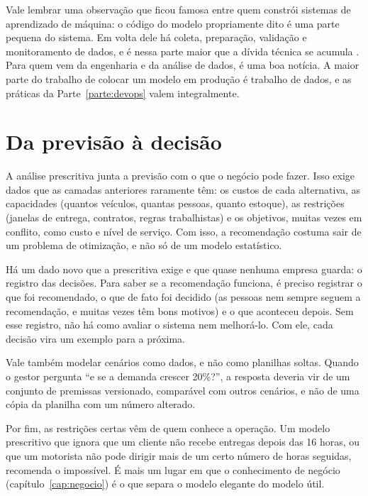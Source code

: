 Vale lembrar uma observação que ficou famosa entre quem constrói sistemas de aprendizado de
máquina: o código do modelo propriamente dito é uma parte pequena do sistema. Em volta dele
há coleta, preparação, validação e monitoramento de dados, e é nessa parte maior que a dívida
técnica se acumula \parencite{sculley2015}. Para quem vem da engenharia e da análise de
dados, é uma boa notícia. A maior parte do trabalho de colocar um modelo em produção é
trabalho de dados, e as práticas da Parte~\ref{parte:devops} valem integralmente.

\section{Da previsão à decisão}
\label{sec:prescritiva}

A análise prescritiva junta a previsão com o que o negócio pode fazer. Isso exige dados que
as camadas anteriores raramente têm: os custos de cada alternativa, as capacidades (quantos
veículos, quantas pessoas, quanto estoque), as restrições (janelas de entrega, contratos,
regras trabalhistas) e os objetivos, muitas vezes em conflito, como custo e nível de
serviço. Com isso, a recomendação costuma sair de um problema de otimização, e não só de um
modelo estatístico.

Há um dado novo que a prescritiva exige e que quase nenhuma empresa guarda: o registro das
decisões. Para saber se a recomendação funciona, é preciso registrar o que foi recomendado,
o que de fato foi decidido (as pessoas nem sempre seguem a recomendação, e muitas vezes têm
bons motivos) e o que aconteceu depois. Sem esse registro, não há como avaliar o sistema nem
melhorá-lo. Com ele, cada decisão vira um exemplo para a próxima.

Vale também modelar cenários como dados, e não como planilhas soltas. Quando o gestor
pergunta \enquote{e se a demanda crescer 20\%?}, a resposta deveria vir de um conjunto de
premissas versionado, comparável com outros cenários, e não de uma cópia da planilha com um
número alterado.

Por fim, as restrições certas vêm de quem conhece a operação. Um modelo prescritivo que
ignora que um cliente não recebe entregas depois das 16 horas, ou que um motorista não pode
dirigir mais de um certo número de horas seguidas, recomenda o impossível. É mais um lugar
em que o conhecimento de negócio (capítulo~\ref{cap:negocio}) é o que separa o modelo
elegante do modelo útil.

\begin{leituras}
\end{leituras}
